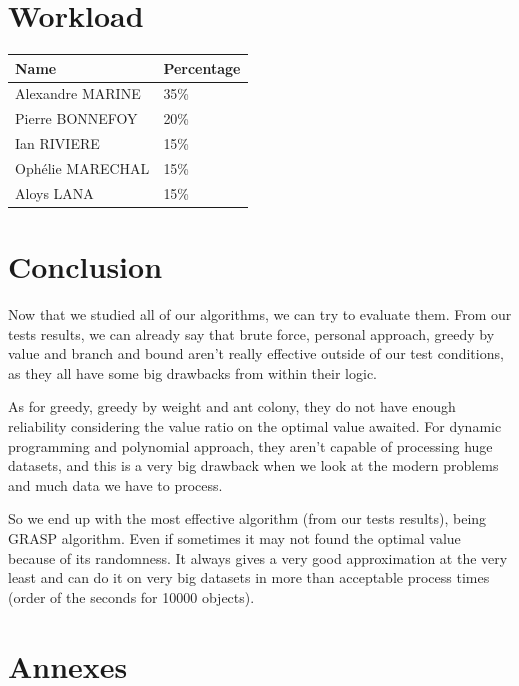 \documentclass[a4paper, 11pt]{article}
\begin{document}
\section{Workload}
\begin{center}
    \begin{tabular}{|p{4cm}|p{2cm}|}
        \hline
        \textbf{Name} & \textbf{Percentage} \\
        \hline
        \hline
        Alexandre MARINE &  35\% \\
        \hline 
        Pierre BONNEFOY &  20\% \\
        \hline
        Ian RIVIERE & 15\% \\
        \hline
        Ophélie MARECHAL &  15\% \\
        \hline 
        Aloys LANA &  15\% \\
        \hline
    \end{tabular}
\end{center}

\section{Conclusion}

Now that we studied all of our algorithms, we can try to evaluate them. From our tests results, we can already say that brute force, personal approach, greedy by value and branch and bound aren't really effective outside of our test conditions, as they all have some big drawbacks from within their logic.

As for greedy, greedy by weight and ant colony, they do not have enough reliability considering the value ratio on the optimal value awaited.
For dynamic programming and polynomial approach, they aren't capable of processing huge datasets, and this is a very big drawback when we look at the modern problems and much data we have to process.

So we end up with the most effective algorithm (from our tests results), being GRASP algorithm. Even if sometimes it may not found the optimal value because of its randomness. It always gives a very good approximation at the very least and can do it on very big datasets in more than acceptable process times (order of the seconds for 10000 objects).

\newpage

\appendix
\section{Annexes}
\end{document}

